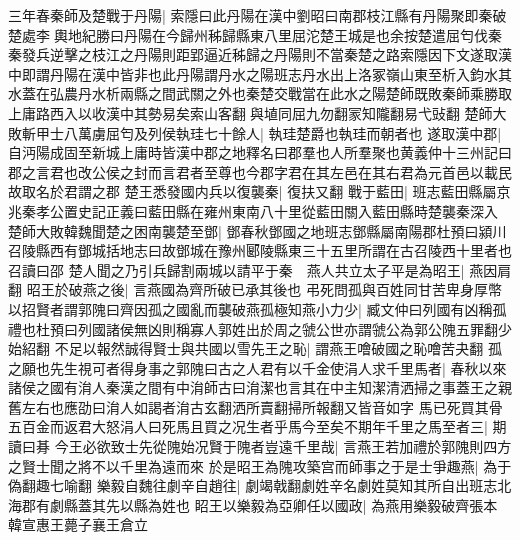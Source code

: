 三年春秦師及楚戰于丹陽|{
	索隱曰此丹陽在漢中劉昭曰南郡枝江縣有丹陽聚即秦破楚處李輿地紀勝曰丹陽在今歸州秭歸縣東八里屈沱楚王城是也余按楚遣屈匄伐秦秦發兵逆擊之枝江之丹陽則距郢逼近秭歸之丹陽則不當秦楚之路索隱因下文遂取漢中即謂丹陽在漢中皆非也此丹陽謂丹水之陽班志丹水出上洛冢嶺山東至析入鈞水其水蓋在弘農丹水析兩縣之間武關之外也秦楚交戰當在此水之陽楚師既敗秦師乘勝取上庸路西入以收漢中其勢易矣索山客翻與埴同屈九勿翻冡知隴翻易弋䜴翻
	}
楚師大敗斬甲士八萬虜屈匄及列侯執珪七十餘人|{
	執珪楚爵也執珪而朝者也
	}
遂取漢中郡|{
	自沔陽成固至新城上庸時皆漢中郡之地釋名曰郡羣也人所羣聚也黄義仲十三州記曰郡之言君也改公侯之封而言君者至尊也今郡字君在其左邑在其右君為元首邑以載民故取名於君謂之郡
	}
楚王悉發國内兵以復襲秦|{
	復扶又翻
	}
戰于藍田|{
	班志藍田縣屬京兆秦孝公置史記正義曰藍田縣在雍州東南八十里從藍田關入藍田縣時楚襲秦深入
	}
楚師大敗韓魏聞楚之困南襲楚至鄧|{
	鄧春秋鄧國之地班志鄧縣屬南陽郡杜預曰潁川召陵縣西有鄧城括地志曰故鄧城在豫州郾陵縣東三十五里所謂在古召陵西十里者也召讀曰邵
	}
楚人聞之乃引兵歸割兩城以請平于秦　燕人共立太子平是為昭王|{
	燕因肩翻
	}
昭王於破燕之後|{
	言燕國為齊所破已承其後也
	}
弔死問孤與百姓同甘苦卑身厚幣以招賢者謂郭隗曰齊因孤之國亂而襲破燕孤極知燕小力少|{
	臧文仲曰列國有凶稱孤禮也杜預曰列國諸侯無凶則稱寡人郭姓出於周之虢公世亦謂虢公為郭公隗五罪翻少始紹翻
	}
不足以報然誠得賢士與共國以雪先王之恥|{
	謂燕王噲破國之恥噲苦夬翻
	}
孤之願也先生視可者得身事之郭隗曰古之人君有以千金使涓人求千里馬者|{
	春秋以來諸侯之國有㳙人秦漢之間有中㳙師古曰㳙潔也言其在中主知潔清洒掃之事蓋王之親舊左右也應劭曰㳙人如謁者㳙古玄翻洒所賣翻掃所報翻又皆音如字
	}
馬已死買其骨五百金而返君大怒涓人曰死馬且買之况生者乎馬今至矣不期年千里之馬至者三|{
	期讀曰朞
	}
今王必欲致士先從隗始况賢于隗者豈遠千里哉|{
	言燕王若加禮於郭隗則四方之賢士聞之將不以千里為遠而來
	}
於是昭王為隗攻築宫而師事之于是士爭趣燕|{
	為于偽翻趣七喻翻
	}
樂毅自魏往劇辛自趙往|{
	劇竭戟翻劇姓辛名劇姓莫知其所自出班志北海郡有劇縣蓋其先以縣為姓也
	}
眧王以樂毅為亞卿任以國政|{
	為燕用樂毅破齊張本
	}
韓宣惠王薨子襄王倉立

